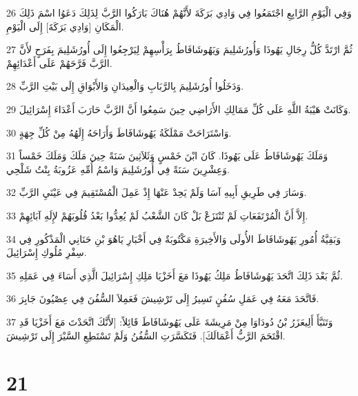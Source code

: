\par 26 وَفِي الْيَوْمِ الرَّابِعِ اجْتَمَعُوا فِي وَادِي بَرَكَةَ لأَنَّهُمْ هُنَاكَ بَارَكُوا الرَّبَّ لِذَلِكَ دَعَوُا اسْمَ ذَلِكَ الْمَكَانِ [وَادِي بَرَكَةَ] إِلَى الْيَوْمِ.
\par 27 ثُمَّ ارْتَدَّ كُلُّ رِجَالِ يَهُوذَا وَأُورُشَلِيمَ وَيَهُوشَافَاطُ بِرَأْسِهِمْ لِيَرْجِعُوا إِلَى أُورُشَلِيمَ بِفَرَحٍ لأَنَّ الرَّبَّ فَرَّحَهُمْ عَلَى أَعْدَائِهِمْ.
\par 28 وَدَخَلُوا أُورُشَلِيمَ بِالرَّبَابِ وَالْعِيدَانِ وَالأَبْوَاقِ إِلَى بَيْتِ الرَّبِّ.
\par 29 وَكَانَتْ هَيْبَةُ اللَّهِ عَلَى كُلِّ مَمَالِكِ الأَرَاضِي حِينَ سَمِعُوا أَنَّ الرَّبَّ حَارَبَ أَعْدَاءَ إِسْرَائِيلَ.
\par 30 وَاسْتَرَاحَتْ مَمْلَكَةُ يَهُوشَافَاطَ وَأَرَاحَهُ إِلَهُهُ مِنْ كُلِّ جِهَةٍ.
\par 31 وَمَلَكَ يَهُوشَافَاطُ عَلَى يَهُوذَا. كَانَ ابْنَ خَمْسٍ وَثَلاَثِينَ سَنَةً حِينَ مَلَكَ وَمَلَكَ خَمْساً وَعِشْرِينَ سَنَةً فِي أُورُشَلِيمَ وَاسْمُ أُمِّهِ عَزُوبَةُ بِنْتُ شَلْحِي.
\par 32 وَسَارَ فِي طَرِيقِ أَبِيهِ آسَا وَلَمْ يَحِدْ عَنْهَا إِذْ عَمِلَ الْمُسْتَقِيمَ فِي عَيْنَيِ الرَّبِّ.
\par 33 إِلاَّ أَنَّ الْمُرْتَفَعَاتِ لَمْ تُنْتَزَعْ بَلْ كَانَ الشَّعْبُ لَمْ يُعِدُّوا بَعْدُ قُلُوبَهُمْ لإِلَهِ آبَائِهِمْ.
\par 34 وَبَقِيَّةُ أُمُورِ يَهُوشَافَاطَ الأُولَى وَالأَخِيرَةِ مَكْتُوبَةٌ فِي أَخْبَارِ يَاهُوَ بْنِ حَنَانِي الْمَذْكُورِ فِي سِفْرِ مُلُوكِ إِسْرَائِيلَ.
\par 35 ثُمَّ بَعْدَ ذَلِكَ اتَّحَدَ يَهُوشَافَاطُ مَلِكُ يَهُوذَا مَعَ أَخَزْيَا مَلِكِ إِسْرَائِيلَ الَّذِي أَسَاءَ فِي عَمَلِهِ.
\par 36 فَاتَّحَدَ مَعَهُ فِي عَمَلِ سُفُنٍ تَسِيرُ إِلَى تَرْشِيشَ فَعَمِلاَ السُّفُنَ فِي عِصْيُونَ جَابِرَ.
\par 37 وَتَنَبَّأَ أَلِيعَزَرُ بْنُ دُودَاوَا مِنْ مَرِيشَةَ عَلَى يَهُوشَافَاطَ قَائِلاً: [لأَنَّكَ اتَّحَدْتَ مَعَ أَخَزْيَا قَدِ اقْتَحَمَ الرَّبُّ أَعْمَالَكَ]. فَتَكَسَّرَتِ السُّفُنُ وَلَمْ تَسْتَطِعِ السَّيْرَ إِلَى تَرْشِيشَ.

\chapter{21}

